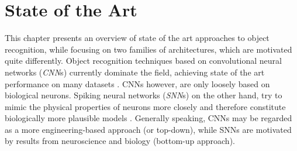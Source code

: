 \chapter{State of the Art}\label{chapter:state-of-the-art}
This chapter presents an overview of state of the art approaches to object recognition, while focusing on two families of architectures, which are motivated quite differently. Object recognition techniques based on convolutional neural networks (\emph{CNN}s) currently dominate the field, achieving state of the art performance on many datasets \cite{Diba2017WeaklySC,7506134}. CNNs however, are only loosely based on biological neurons. Spiking neural networks (\emph{SNN}s) on the other hand, try to mimic the physical properties of neurons more closely and therefore constitute biologically more plausible models \cite{Schofield20180027}. Generally speaking, CNNs may be regarded as a more engineering-based approach (or top-down), while SNNs are motivated by results from neuroscience and biology (bottom-up approach).
